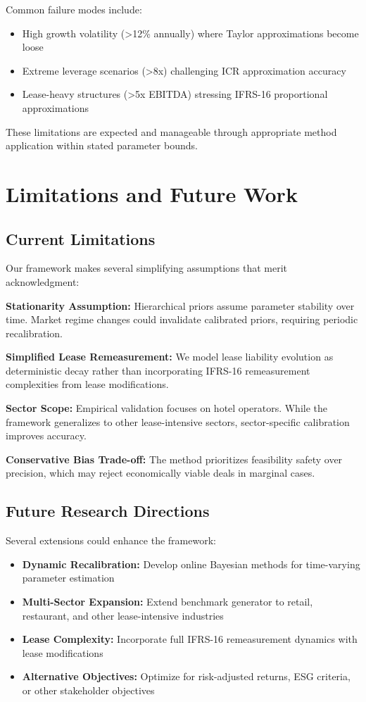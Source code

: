 \documentclass[11pt,a4paper]{article}
\begin{document}
Common failure modes include:
\begin{itemize}
\item High growth volatility (>12\% annually) where Taylor approximations become loose
\item Extreme leverage scenarios (>8x) challenging ICR approximation accuracy  
\item Lease-heavy structures (>5x EBITDA) stressing IFRS-16 proportional approximations
\end{itemize}

These limitations are expected and manageable through appropriate method application within stated parameter bounds.

\section{Limitations and Future Work}

\subsection{Current Limitations}

Our framework makes several simplifying assumptions that merit acknowledgment:

\textbf{Stationarity Assumption:} Hierarchical priors assume parameter stability over time. Market regime changes could invalidate calibrated priors, requiring periodic recalibration.

\textbf{Simplified Lease Remeasurement:} We model lease liability evolution as deterministic decay rather than incorporating IFRS-16 remeasurement complexities from lease modifications.

\textbf{Sector Scope:} Empirical validation focuses on hotel operators. While the framework generalizes to other lease-intensive sectors, sector-specific calibration improves accuracy.

\textbf{Conservative Bias Trade-off:} The method prioritizes feasibility safety over precision, which may reject economically viable deals in marginal cases.

\subsection{Future Research Directions}

Several extensions could enhance the framework:

\begin{itemize}
\item \textbf{Dynamic Recalibration:} Develop online Bayesian methods for time-varying parameter estimation
\item \textbf{Multi-Sector Expansion:} Extend benchmark generator to retail, restaurant, and other lease-intensive industries
\item \textbf{Lease Complexity:} Incorporate full IFRS-16 remeasurement dynamics with lease modifications
\item \textbf{Alternative Objectives:} Optimize for risk-adjusted returns, ESG criteria, or other stakeholder objectives
\end{itemize}
\end{document}
